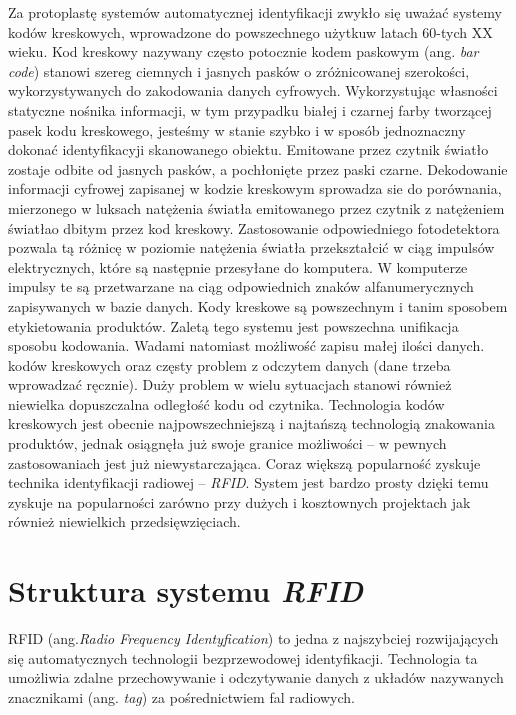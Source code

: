 Za protoplastę systemów automatycznej identyfikacji zwykło się uważać systemy kodów kreskowych, wprowadzone do powszechnego użytkuw latach 60-tych XX wieku.
Kod kreskowy nazywany często potocznie kodem paskowym (ang. \emph{bar code}) stanowi szereg ciemnych i jasnych pasków o zróżnicowanej szerokości, wykorzystywanych do zakodowania danych cyfrowych. Wykorzystując własności statyczne nośnika informacji, w tym przypadku białej i czarnej farby tworzącej pasek kodu kreskowego, jesteśmy w stanie szybko i w sposób jednoznaczny dokonać identyfikacyji skanowanego obiektu. Emitowane przez czytnik światło zostaje odbite od jasnych pasków, a pochłonięte przez paski czarne. Dekodowanie informacji cyfrowej zapisanej w kodzie kreskowym sprowadza sie do porównania, mierzonego w luksach natężenia światła emitowanego przez czytnik z natężeniem światłao dbitym przez kod kreskowy. Zastosowanie odpowiedniego fotodetektora pozwala tą różnicę w poziomie natężenia światła przekształcić w ciąg impulsów elektrycznych, które są następnie przesyłane do komputera. W komputerze impulsy te są przetwarzane na ciąg odpowiednich znaków alfanumerycznych zapisywanych w bazie danych. 
Kody kreskowe są powszechnym i tanim sposobem etykietowania produktów. Zaletą tego systemu jest powszechna unifikacja sposobu kodowania. Wadami  natomiast możliwość zapisu małej ilości danych. kodów kreskowych oraz częsty problem z odczytem danych (dane trzeba wprowadzać ręcznie). Duży problem w wielu sytuacjach stanowi również niewielka dopuszczalna odległość kodu od czytnika. 
Technologia kodów kreskowych jest obecnie najpowszechniejszą i najtańszą technologią znakowania produktów, jednak osiągnęła już swoje granice możliwości – w pewnych zastosowaniach jest już niewystarczająca.
Coraz większą popularność zyskuje technika identyfikacji radiowej – \emph{RFID}. System jest bardzo prosty dzięki temu zyskuje na popularności zarówno przy dużych i kosztownych projektach jak również  niewielkich przedsięwzięciach.

\section{Struktura systemu \emph{RFID}}

RFID (ang.\emph {Radio Frequency  Identyfication}) to jedna z najszybciej rozwijających  się automatycznych technologii bezprzewodowej  identyfikacji. Technologia ta umożliwia zdalne przechowywanie i odczytywanie danych z układów nazywanych znacznikami (ang. \emph{tag}) za pośrednictwiem fal radiowych. 

